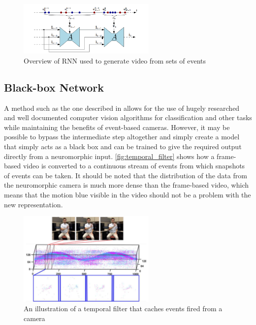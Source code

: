 \begin{figure}[htb]
      \centering
      \includegraphics[width=0.6\textwidth]{background/images/spikes_to_video_rnn.png}
      \caption{Overview of RNN used to generate video from sets of events\cite{spikingToVideo}}
      \label{fig:spikes_to_video_rnn}
\end{figure}

\subsection{Black-box Network}

A method such as the one described in  allows for the use of hugely researched and well documented computer vision algorithms for classification and other tasks while maintaining the benefits of event-based cameras. However, it may be possible to bypass the intermediate step altogether and simply create a model that simply acts as a black box and can be trained to give the required output directly from a neuromorphic input. \autoref{fig:temporal_filter} shows how a frame-based video is converted to a continuous stream of events from which snapshots of events can be taken. It should be noted that the distribution of the data from the neuromorphic camera is much more dense than the frame-based video, which means that the motion blue visible in the video should not be a problem with the new representation.

\begin{figure}[htb]
      \centering
      \includegraphics[width=0.6\textwidth]{background/images/temporal_filter.png}
      \caption{An illustration of a temporal filter that caches events fired from a camera\cite{eventBasedGestureRec}}
      \label{fig:temporal_filter}
\end{figure}

